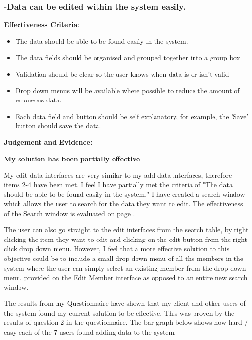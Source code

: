 \pagebreak
\subsubsection{-Data can be edited within the system easily.}

\textbf{Effectiveness Criteria:}\newline
\begin{itemize}
	\item{The data should be able to be found easily in the system.}
	\item{The data fields should be organised and grouped together into a group box}
	\item{Validation should be clear so the user knows when data is or isn't valid}
	\item{Drop down menus will be available where possible to reduce the amount of erroneous data.}
	\item{Each data field and button should be self explanatory, for example, the 'Save' button should save the data.}
\end{itemize}

\textbf{Judgement and Evidence:} \newline

\textbf{\large{My solution has been partially effective}}

My edit data interfaces are very similar to my add data interfaces, therefore items 2-4 have been met. I feel I have partially met the criteria of "The data should be able to be found easily in the system." I have created a search window which allows the user to search for the data they want to edit. The effectiveness of the Search window is evaluated on page \pageref{fig:search-evidence}.
 
The user can also go straight to the edit interfaces from the search table, by right clicking the item they want to edit and clicking on the edit button from the right click drop down menu. However, I feel that a more effective solution to this objective could be to include a small drop down menu of all the members in the system where the user can simply select an existing member from the drop down menu, provided on the Edit Member interface as opposed to an entire new search window. 
 
The results from my Questionnaire have shown that my client and other users of the system found my current solution to be effective. This was proven by the results of question 2 in the questionnaire. The bar graph below shows how hard / easy each of the 7 users found adding data to the system.
 
